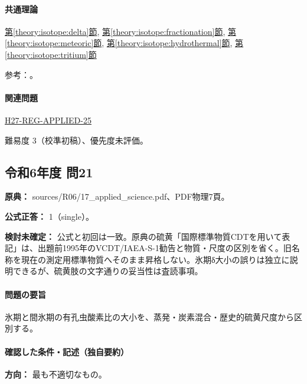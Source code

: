\paragraph{共通理論} \hyperref[theory:isotope:delta]{第\ref*{theory:isotope:delta}節}, \hyperref[theory:isotope:fractionation]{第\ref*{theory:isotope:fractionation}節}, \hyperref[theory:isotope:meteoric]{第\ref*{theory:isotope:meteoric}節}, \hyperref[theory:isotope:hydrothermal]{第\ref*{theory:isotope:hydrothermal}節}, \hyperref[theory:isotope:tritium]{第\ref*{theory:isotope:tritium}節}

\par 参考：\cite{iso_tritium2023,iso_vsmow2,gc_meteoric,iso_hydrothermal}。

\paragraph{関連問題} \hyperref[q:h27-reg-applied-25]{H27-REG-APPLIED-25}

\par 難易度 3（校準初稿）、優先度未評価。

\subsection{令和6年度 問21}
\label{q:r06-reg-applied-21}

\noindent\textbf{原典：} sources/R06/17\_applied\_science.pdf、PDF物理7頁。

\textbf{公式正答：} 1（single）。

\par\textbf{検討未確定：} 公式と初回は一致。原典の硫黄「国際標準物質CDTを用いて表記」は、出題前1995年のVCDT/IAEA-S-1勧告と物質・尺度の区別を省く。旧名称を現在の測定用標準物質へそのまま昇格しない。氷期δ大小の誤りは独立に説明できるが、硫黄肢の文字通りの妥当性は査読事項。

\paragraph{問題の要旨} 氷期と間氷期の有孔虫酸素比の大小を、蒸発・炭素混合・歴史的硫黄尺度から区別する。

\paragraph{確認した条件・記述（独自要約）}\mbox{}\par

\noindent\textbf{方向：} 最も不適切なもの。\par

